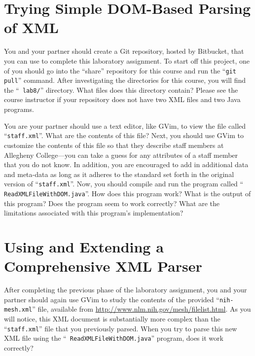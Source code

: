 \section*{Trying Simple DOM-Based Parsing of XML}

You and your partner should create a Git repository, hosted by Bitbucket, that you can use to complete this laboratory
assignment.  To start off this project, one of you should go into the ``share'' repository for this course and run the
``{\tt git pull}'' command. After investigating the directories for this course, you will find the ``{\tt
  lab8/}'' directory. What files does this directory contain?  Please see the course instructor if your repository does
not have two XML files and two Java programs.

You are your partner should use a text editor, like GVim, to view the file called ``{\tt staff.xml}''.  What are the
contents of this file?  Next, you should use GVim to customize the contents of this file so that they describe staff
members at Allegheny College---you can take a guess for any attributes of a staff member that you do not know.  In
addition, you are encouraged to add in additional data and meta-data as long as it adheres to the standard set forth in
the original version of ``{\tt staff.xml}''. Now, you should compile and run the program called ``{\tt
  ReadXMLFileWithDOM.java}''. How does this program work? What is the output of this program? Does the program seem to
work correctly? What are the limitations associated with this program's implementation? 

\vspace*{-.05in}
\section*{Using and Extending a Comprehensive XML Parser}

After completing the previous phase of the laboratory assignment, you and your partner should again use GVim to study
the contents of the provided ``{\tt nih-mesh.xml}'' file, available from
\url{http://www.nlm.nih.gov/mesh/filelist.html}. As you will notice, this XML document is substantially more complex
than the ``{\tt staff.xml}'' file that you previously parsed.  When you try to parse this new XML file using the ``{\tt
  ReadXMLFileWithDOM.java}'' program, does it work correctly?

